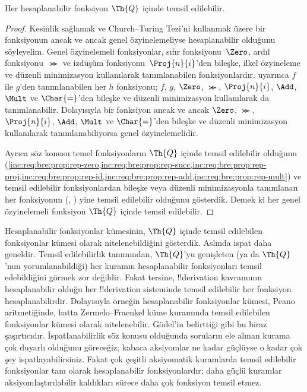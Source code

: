 


\begin{thm}
Her hesaplanabilir fonksiyon $\Th{Q}$ içinde temsil edilebilir.
\end{thm}

\begin{proof}
Kesinlik sağlamak ve Church--Turing Tezi'ni kullanmak üzere bir fonksiyonun
ancak ve ancak genel özyinelemeliyse hesaplanabilir olduğunu söyleyelim.
Genel özyinelemeli fonksiyonlar, sıfır fonksiyonu~$\Zero$, ardıl
fonksiyonu~$\Succ$ ve izdüşüm fonksiyonu~$\Proj{n}{i}$'den bileşke, ilkel
özyineleme ve düzenli minimizasyon kullanılarak tanımlanabilen
fonksiyonlardır.  uyarınca $f$ ile $g$'den
tanımlanabilen her $h$ fonksiyonu; $f$, $g$, $\Zero$, $\Succ$,
$\Proj{n}{i}$, $\Add$, $\Mult$ ve $\Char{=}$'den bileşke ve düzenli
minimizasyon kullanılarak da tanımlanabilir. Dolayısıyla bir fonksiyon ancak
ve ancak $\Zero$, $\Succ$, $\Proj{n}{i}$, $\Add$, $\Mult$ ve $\Char{=}$'den
bileşke ve düzenli minimizasyon kullanılarak tanımlanabiliyorsa genel
özyinelemelidir.

Ayrıca söz konusu temel fonksiyonların $\Th{Q}$ içinde temsil edilebilir
olduğunu
(\cref{inc:req:bre:prop:rep-zero,inc:req:bre:prop:rep-succ,inc:req:bre:prop:rep-proj,inc:req:bre:prop:rep-id,inc:req:bre:prop:rep-add,inc:req:bre:prop:rep-mult})
ve temsil edilebilir fonksiyonlardan bileşke veya düzenli minimizasyonla
tanımlanan her fonksiyonun
(,
) yine temsil edilebilir olduğunu gösterdik.
Demek ki her genel özyinelemeli fonksiyon $\Th{Q}$ içinde temsil edilebilir.
\end{proof}

\begin{explain}
Hesaplanabilir fonksiyonlar kümesinin, $\Th{Q}$ içinde temsil edilebilen
fonksiyonlar kümesi olarak nitelenebildiğini gösterdik. Aslında ispat daha
geneldir. Temsil edilebilirlik tanımından, $\Th{Q}$'yu genişleten (ya da
$\Th{Q}$'nun yorumlanabildiği) her kuramın hesaplanabilir fonksiyonları temsil
edebildiğini görmek zor değildir. Fakat tersine, !!{derivation} kavramının
hesaplanabilir olduğu her !!{derivation} sisteminde temsil edilebilir her
fonksiyon hesaplanabilirdir. Dolayısıyla örneğin hesaplanabilir fonksiyonlar
kümesi, Peano aritmetiğinde, hatta Zermelo--Fraenkel küme kuramında temsil
edilebilen fonksiyonlar kümesi olarak nitelenebilir. G\"odel'in belirttiği
gibi bu biraz şaşırtıcıdır. İspatlanabilirlik söz konusu olduğunda soruların
ele alınan kurama çok duyarlı olduğunu göreceğiz; kabaca aksiyomlar ne kadar
güçlüyse o kadar çok şey ispatlayabilirsiniz. Fakat çok çeşitli aksiyomatik
kuramlarda temsil edilebilir fonksiyonlar tam olarak hesaplanabilir
fonksiyonlardır; daha güçlü kuramlar aksiyomlaştırılabilir kaldıkları sürece
daha çok fonksiyon temsil etmez.
\end{explain}

